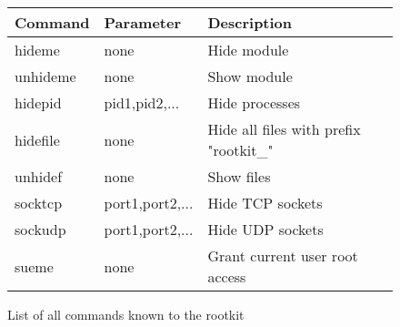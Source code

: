 \begin{figure}[h]
\centering
\begin{tabular}{|l|l|l|}
\hline
Command & Parameter & Description \\\hline\hline
hideme & none & Hide module \\\hline
unhideme & none & Show module \\\hline
hidepid & pid1,pid2,... & Hide processes \\\hline
hidefile & none & Hide all files with prefix "rootkit\_"\\\hline
unhidef & none & Show files \\\hline
socktcp & port1,port2,... & Hide TCP sockets \\\hline
sockudp & port1,port2,... & Hide UDP sockets \\\hline
sueme & none & Grant current user root access\\\hline
\end{tabular}
\caption{List of all commands known to the rootkit}
\end{figure}
